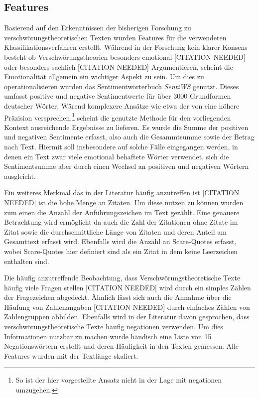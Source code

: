 \subsection{Features}

Basierend auf den Erkenntnissen der bisherigen Forschung zu verschwörungstheoretischen Texten wurden Features für die verwendeten Klassifikationsverfahren erstellt.
Während in der Forschung kein klarer Konsens besteht ob Verschwörungstheorien besonders emotional [CITATION NEEDED] oder besonders sachlich [CITATION NEEDED] Argumentieren, scheint die Emotionalität allgemein ein wichtiger Aspekt zu sein.
Um dies zu operationalisieren wurden das Sentimentwörterbuch \textit{SentiWS} \parencite[][]{sentiws} genutzt.
Dieses umfasst positive und negative Sentimentwerte für über 3000 Grundformen deutscher Wörter.
Wärend komplexere Ansätze wie etwa der von \autocite*[]{ml_sentiment} eine höhere Präzision versprechen,\footnote{So ist der hier vorgestellte Ansatz nicht in der Lage mit negationen umzugehen.} scheint die genutzte Methode für den vorliegenden Kontext ausreichende Ergebnisse zu lieferen.
Es wurde die Summe der positiven und negativen Sentimente erfasst, also auch die Gesammtsumme sowie der Betrag nach Text.
Hiermit soll insbesondere auf solche Fälle eingegangen werden, in denen ein Text zwar viele emotional behaftete Wörter verwendet, sich die Sentimentsumme aber durch einen Wechsel an positiven und negativen Wörtern ausgleicht.

Ein weiteres Merkmal das in der Literatur häufig anzutreffen ist [CITATION NEEDED] ist die hohe Menge an Zitaten.
Um diese nutzen zu können wurden zum einen die Anzahl der Anführungszeichen im Text gezählt.
Eine genauere Betrachtung wird ermöglicht da auch die Zahl der Zitationen ohne Zitate im Zitat sowie die durchschnittliche Länge von Zitaten und deren Anteil am Gesamttext erfasst wird.
Ebenfalls wird die Anzahl an Scare-Quotes erfasst, wobei Scare-Quotes hier definiert sind als ein Zitat in dem keine Leerzeichen enthalten sind.

Die häufig anzutreffende Beobachtung, dass Verschwörungstheoretische Texte häufig viele Fragen stellen [CITATION NEEDED] wird durch ein simples Zählen der Fragezeichen abgedeckt.
Ähnlich lässt sich auch die Annahme über die Häufung von Zahlenangaben [CITATION NEEDED] durch einfaches Zählen von Zahlengruppen abbilden.
Ebenfalls wird in der Literatur davon gesprochen, dass verschwörungstheoretische Texte häufig negationen verwenden.
Um dies Informationen nutzbar zu machen wurde händisch eine Liste von 15 Negationswörtern erstellt und deren Häufigkeit in den Texten gemessen.
Alle Features wurden mit der Textlänge skaliert.

